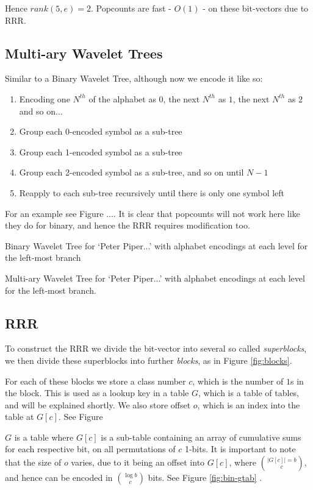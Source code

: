 Hence $rank(5, e) = 2$. Popcounts are fast - $O(1)$ - on these bit-vectors due
to RRR.


\subsection{Multi-ary Wavelet Trees}
Similar to a Binary Wavelet Tree, although now we encode it like so:

\begin{enumerate}
    \item Encoding one $N^{th}$ of the alphabet as $0$, the next $N^{th}$ as $1$,
    the next $N^{th}$ as $2$ and so on...
    \item Group each 0-encoded symbol as a sub-tree
    \item Group each 1-encoded symbol as a sub-tree
    \item Group each 2-encoded symbol as a sub-tree, and so on until $N-1$
    \item Reapply to each sub-tree recursively until there is only one symbol
    left
\end{enumerate}
For an example see Figure .... It is clear that popcounts will not work
here like they do for binary, and hence the RRR requires modification too.

			{Binary Wavelet Tree for `Peter Piper...' with alphabet
			encodings at each level for the left-most branch}
		
			{Multi-ary Wavelet Tree for `Peter Piper...' with alphabet
			encodings at each level for the left-most branch.}



\subsection{RRR}
To construct the RRR we divide the bit-vector into several so called \emph{superblocks}, we then divide these superblocks into further \emph{blocks}, as in Figure \ref{fig:blocks}.

For each of these blocks we store a class number $c$, which is the number of $1$s in the block. This is used as a lookup key in a table $G$, which is a table of tables, and will be explained shortly. We also store offset $o$, which is an index into the table at $G[c]$. See Figure%

$G$ is a table where $G[c]$ is a sub-table containing an array of cumulative sums for each respective bit, on all permutations of $c$ 1-bits. It is important to note that the size of $o$ varies, due to it being an offset into $G[c]$, where $|G[c]| = b \choose c$, and hence can be encoded in $\log b \choose c$ bits. See Figure \ref{fig:bin-gtab} .

